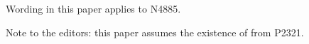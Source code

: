 
% 

Wording in this paper applies to N4885.

Note to the editors: this paper assumes the existence
of  from P2321.

\markboth{\contentsname}{}

\makeatletter
\renewcommand\@pnumwidth{2.5em}
\makeatother

\tableofcontents
\setcounter{tocdepth}{5}

%
